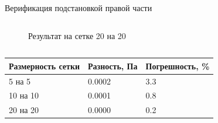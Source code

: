 \documentclass[ignoreonframetext,unicode]{beamer}
\begin{document}
\begin{frame}{Верификация подстановкой правой части}
\begin{columns}
\vspace*{-2mm}
\begin{figure}[!htbp]
	\caption{Результат на сетке 20 на 20}
	\label{res_check_func_1}
\end{figure}
	
\end{columns}	
\vspace*{-2mm}
\begin{table}[!htbp]
	\begin{tabular}{|l|l|l|}
		\hline
		\multicolumn{1}{|c|}{Размерность сетки} & \multicolumn{1}{c|}{Разность, Па} & Погрешность, \% \\ \hline
		5 на 5                                  & 0.0002                              & 3.3            \\ \hline
		10 на 10                                & 0.0001                              & 0.8            \\ \hline
		20 на 20                                & 0.0000                              & 0.2            \\ \hline
	\end{tabular}
\end{table}
	
\end{frame}
\end{document}
